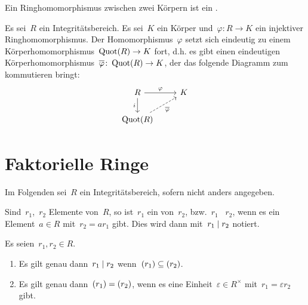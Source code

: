 
\begin{definition}
  Ein Ringhomomorphismus zwischen zwei Körpern ist ein .
\end{definition}


\begin{corollary}
  Es sei~$R$ ein Integritätsbereich.
  Es sei~$K$ ein Körper und~$\varphi \colon R \to K$ ein injektiver Ringhomomorphismus.
  Der Homomorphismus~$\varphi$ setzt sich eindeutig zu einem Körperhomomorphismus~$\Quot(R) \to K$ fort, d.h. es gibt einen eindeutigen Körperhomomorphismus~$\induced{\varphi} \colon \Quot(R) \to K$, der das folgende Diagramm zum kommutieren bringt:
  \[
    \begin{tikzcd}
      R
      \arrow{r}[above]{\varphi}
      \arrow{d}[left]{i}
      &
      K
      \\
      \Quot(R)
      \arrow[dashed]{ur}[below right]{\induced{\varphi}}
      &
      {}
    \end{tikzcd}
  \]
\end{corollary}





\section{Faktorielle Ringe}

\begin{convention}
  Im Folgenden sei~$R$ ein Integritätsbereich, sofern nicht anders angegeben.
\end{convention}

\begin{definition}
  Sind~$r_1$,~$r_2$ Elemente von~$R$, so ist~$r_1$ ein  von~$r_2$, bzw.~$r_1$ ~$r_2$, wenn es ein Element~$a \in R$ mit~$r_2 = a r_1$ gibt.
  Dies wird dann mit~$r_1 \mid r_2$ notiert.
\end{definition}

\begin{proposition}
  Es seien~$r_1, r_2 \in R$.
  \begin{enumerate}
    \item
      Es gilt genau dann~$r_1 \mid r_2$ wenn~$(r_1) \subseteq (r_2)$.
    \item
      Es gilt genau dann~$(r_1) = (r_2)$, wenn es eine Einheit~$\varepsilon \in R^\times$ mit~$r_1 = \varepsilon r_2$ gibt.
  \end{enumerate}
\end{proposition}

